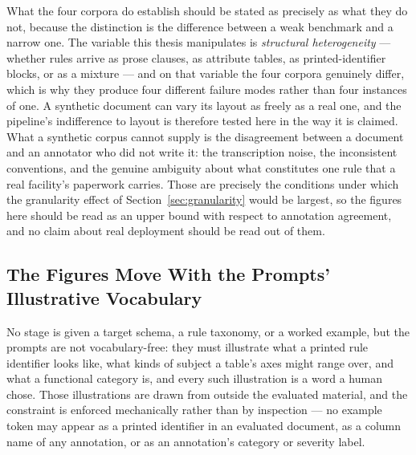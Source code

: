 \documentclass[11pt]{article}
\begin{document}
What the four corpora do establish should be stated as precisely as what they do
not, because the distinction is the difference between a weak benchmark and a
narrow one. The variable this thesis manipulates is \emph{structural
heterogeneity} --- whether rules arrive as prose clauses, as attribute tables,
as printed-identifier blocks, or as a mixture --- and on that variable the four
corpora genuinely differ, which is why they produce four different failure
modes rather than four instances of one. A synthetic document can vary its
layout as freely as a real one, and the pipeline's indifference to layout is
therefore tested here in the way it is claimed. What a synthetic corpus cannot
supply is the disagreement between a document and an annotator who did not write
it: the transcription noise, the inconsistent conventions, and the genuine
ambiguity about what constitutes one rule that a real facility's paperwork
carries. Those are precisely the conditions under which the granularity effect
of Section~\ref{sec:granularity} would be largest, so the figures here should be
read as an upper bound with respect to annotation agreement, and no claim about
real deployment should be read out of them.

\subsection{The Figures Move With the Prompts' Illustrative Vocabulary}
\label{sec:lim_prompt_vocab}
No stage is given a target schema, a rule taxonomy, or a worked example, but the
prompts are not vocabulary-free: they must illustrate what a printed rule
identifier looks like, what kinds of subject a table's axes might range over, and
what a functional category is, and every such illustration is a word a human
chose. Those illustrations are drawn from outside the evaluated material, and the
constraint is enforced mechanically rather than by inspection --- no example
token may appear as a printed identifier in an evaluated document, as a column
name of any annotation, or as an annotation's category or severity label.
\end{document}
